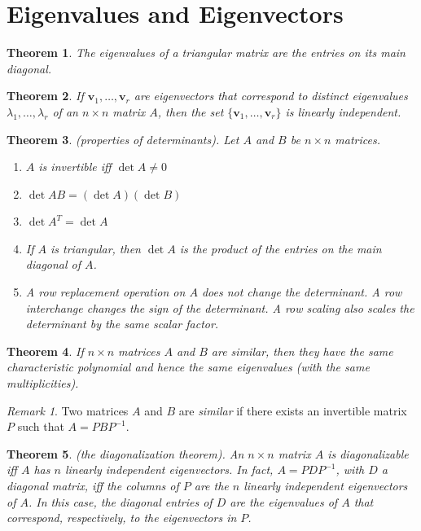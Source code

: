\documentclass{article}
\theoremstyle{plain}
\newtheorem{thm}{Theorem}[section]
\theoremstyle{definition}
\theoremstyle{remark}
\newtheorem*{rem}{Remark}
\begin{document}
\section{Eigenvalues and Eigenvectors}

\begin{thm}
    The eigenvalues of a triangular matrix are the entries on its main diagonal.
\end{thm}

\begin{thm}
    If \(\textbf{v}_1,\ldots,\textbf{v}_r\) are eigenvectors that correspond to distinct eigenvalues \(\lambda_1,\ldots,\lambda_r\) of an \(n\times n\) matrix \(A\), then the set \(\{\textbf{v}_1,\ldots,\textbf{v}_r\}\) is linearly independent.
\end{thm}

\begin{thm} (properties of determinants).
    Let \(A\) and \(B\) be \(n\times n\) matrices.
    \begin{enumerate}
        \item[a.] \(A\) is invertible iff \(\det{A}\neq0\)
        \item[b.] \(\det AB=(\det A)(\det B)\)
        \item[c.] \(\det A^T=\det A\)
        \item[d.] If \(A\) is triangular, then \(\det A\) is the product of the entries on the main diagonal of \(A\).
        \item[e.] A row replacement operation on \(A\) does not change the determinant. A row interchange changes the sign of the determinant. A row scaling also scales the determinant by the same scalar factor.
    \end{enumerate}
\end{thm}

\begin{thm}
    If \(n\times n\) matrices \(A\) and \(B\) are similar, then they have the same characteristic polynomial and hence the same eigenvalues (with the same multiplicities).
\end{thm}

\begin{rem}
    Two matrices \(A\) and \(B\) are \textit{similar} if there exists an invertible matrix \(P\) such that \(A=PBP^{-1}\).
\end{rem}

\begin{thm} (the diagonalization theorem).
    An \(n\times n\) matrix \(A\) is diagonalizable iff \(A\) has \(n\) linearly independent eigenvectors. In fact, \(A=PDP^{-1}\), with \(D\) a diagonal matrix, iff the columns of \(P\) are the \(n\) linearly independent eigenvectors of \(A\). In this case, the diagonal entries of \(D\) are the eigenvalues of \(A\) that correspond, respectively, to the eigenvectors in \(P\).
\end{thm}
\end{document}
